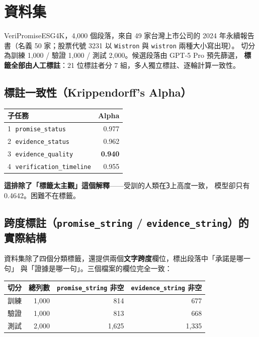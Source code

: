 \documentclass[11pt,a4paper]{ctexart}
\newcommand{\fn}[1]{\texttt{#1}}
\begin{document}
\section{資料集}

VeriPromiseESG4K，4{,}000 個段落，來自 49 家台灣上市公司的 2024 年永續報告書（名義
50 家；股票代號 3231 以 \texttt{Wistron} 與 \texttt{wistron} 兩種大小寫出現）。
切分為訓練 1{,}000 / 驗證 1{,}000 / 測試 2{,}000。候選段落由 GPT-5 Pro 預先篩選，
\textbf{標籤全部由人工標註}：21 位標註者分 7 組，多人獨立標註、逐輪計算一致性。

\subsection{標註一致性（Krippendorff's Alpha）}

\begin{table}[h]
\centering\small
\begin{tabular}{@{}lr@{}}
\toprule
子任務 & Alpha \\
\midrule
\textcircled{1} \fn{promise\_status}        & 0.977 \\
\textcircled{2} \fn{evidence\_status}       & 0.962 \\
\textcircled{3} \fn{evidence\_quality}      & \textbf{0.940} \\
\textcircled{4} \fn{verification\_timeline} & 0.955 \\
\bottomrule
\end{tabular}
\end{table}

\textbf{這排除了「標籤太主觀」這個解釋}——受訓的人類在\textcircled{3}上高度一致，
模型卻只有 0.4642。困難不在標籤。

\subsection{跨度標註（\fn{promise\_string} / \fn{evidence\_string}）的實際結構}
\label{sec:spans}

資料集除了四個分類標籤，還提供兩個\textbf{文字跨度}欄位，標出段落中「承諾是哪一句」
與「證據是哪一句」。三個檔案的欄位完全一致：

\begin{table}[h]
\centering\small
\begin{tabular}{@{}lrrr@{}}
\toprule
切分 & 總列數 & \fn{promise\_string} 非空 & \fn{evidence\_string} 非空 \\
\midrule
訓練 & 1{,}000 & 814 & 677 \\
驗證 & 1{,}000 & 813 & 668 \\
測試 & 2{,}000 & 1{,}625 & 1{,}335 \\
\bottomrule
\end{tabular}
\end{table}
\end{document}

